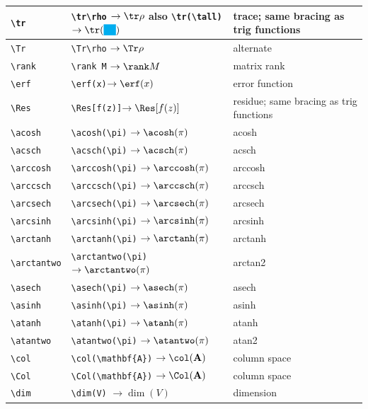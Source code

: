 \documentclass[a4paper,12pt]{article}
\begin{document}
\begin{longtable}[c]{|L{0.2\textwidth}|L{0.35\textwidth}|L{0.35\textwidth}|}
\hline
\verb|\tr| & \verb|\tr\rho| $\rightarrow \tr\rho$ also \verb|\tr(\tall)| $\rightarrow \tr(\tall)$  & trace; same bracing as trig functions \\\hline
\verb|\Tr| & \verb|\Tr\rho| $\rightarrow \Tr\rho$ & alternate \\\hline
\verb|\rank| & \verb|\rank M| $\rightarrow \rank M$ & matrix rank \\\hline
\verb|\erf| & \verb|\erf(x)|$\rightarrow \erf(x)$ & error function \\\hline
\verb|\Res| & \verb|\Res[f(z)]|$\rightarrow \Res[f(z)]$ & residue; same bracing as trig functions \\\hline
\verb|\acosh| & \verb|\acosh(\pi)| $\rightarrow\acosh(\pi)$ & acosh \\\hline
\verb|\acsch| & \verb|\acsch(\pi)| $\rightarrow\acsch(\pi)$ & acsch \\\hline
\verb|\arccosh| & \verb|\arccosh(\pi)| $\rightarrow\arccosh(\pi)$ & arccosh \\\hline
\verb|\arccsch| & \verb|\arccsch(\pi)| $\rightarrow\arccsch(\pi)$ & arccsch \\\hline
\verb|\arcsech| & \verb|\arcsech(\pi)| $\rightarrow\arcsech(\pi)$ & arcsech \\\hline
\verb|\arcsinh| & \verb|\arcsinh(\pi)| $\rightarrow\arcsinh(\pi)$ & arcsinh \\\hline
\verb|\arctanh| & \verb|\arctanh(\pi)| $\rightarrow\arctanh(\pi)$ & arctanh \\\hline
\verb|\arctantwo| & \verb|\arctantwo(\pi)| $\rightarrow\arctantwo(\pi)$ & arctan2 \\\hline
\verb|\asech| & \verb|\asech(\pi)| $\rightarrow\asech(\pi)$ & asech \\\hline
\verb|\asinh| & \verb|\asinh(\pi)| $\rightarrow\asinh(\pi)$ & asinh \\\hline
\verb|\atanh| & \verb|\atanh(\pi)| $\rightarrow\atanh(\pi)$ & atanh \\\hline
\verb|\atantwo| & \verb|\atantwo(\pi)| $\rightarrow\atantwo(\pi)$ & atan2 \\\hline
\verb|\col| & \verb|\col(\mathbf{A})| $\rightarrow\col(\mathbf{A})$ & column space \\\hline
\verb|\Col| & \verb|\Col(\mathbf{A})| $\rightarrow\Col(\mathbf{A})$ & column space \\\hline
\verb|\dim| & \verb|\dim(V)| $\rightarrow\dim(V)$ & dimension \\\hline

\end{longtable}
\end{document}
